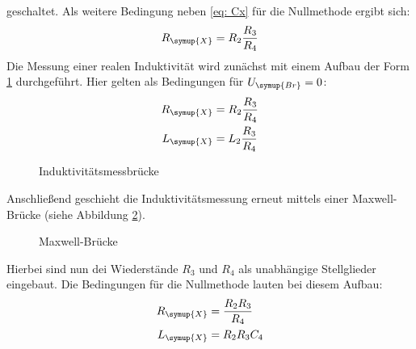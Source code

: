 geschaltet. Als weitere Bedingung neben \eqref{eq: Cx} für die Nullmethode ergibt sich:
\begin{equation}
  R_{\symup{X}} = R_2\frac{R_3}{R_4}
  \label{eq: Rx}
\end{equation}
Die Messung einer realen Induktivität wird zunächst mit einem Aufbau der Form \ref{fig: induktivität} durchgeführt.
Hier gelten als Bedingungen für $U_{\symup{Br}} = 0$:
\begin{align}
  \begin{aligned}
    R_{\symup{X}} &= R_2\frac{R_3}{R_4} \\
    L_{\symup{X}} &= L_2\frac{R_3}{R_4}
  \end{aligned}
  \label{eq: Lx}
\end{align}
\begin{figure}
  \centering
  \caption{Induktivitätsmessbrücke\cite{anleitung302}}
  \label{fig: induktivität}
\end{figure}
Anschließend geschieht die Induktivitätsmessung erneut mittels einer Maxwell-Brücke (siehe Abbildung \ref{fig: maxwell}).
\begin{figure}
  \centering
  \caption{Maxwell-Brücke\cite{anleitung302}}
  \label{fig: maxwell}
\end{figure}
Hierbei sind nun dei Wiederstände $R_3$ und $R_4$ als unabhängige Stellglieder eingebaut. Die Bedingungen für die Nullmethode lauten
bei diesem Aufbau:
\begin{align}
  \begin{aligned}
    R_{\symup{X}} &=\frac{R_2 R_3}{R_4} \\
    L_{\symup{X}} &= R_2 R_3 C_4
  \end{aligned}
  \label{eq: Lx_maxwell}
\end{align}
